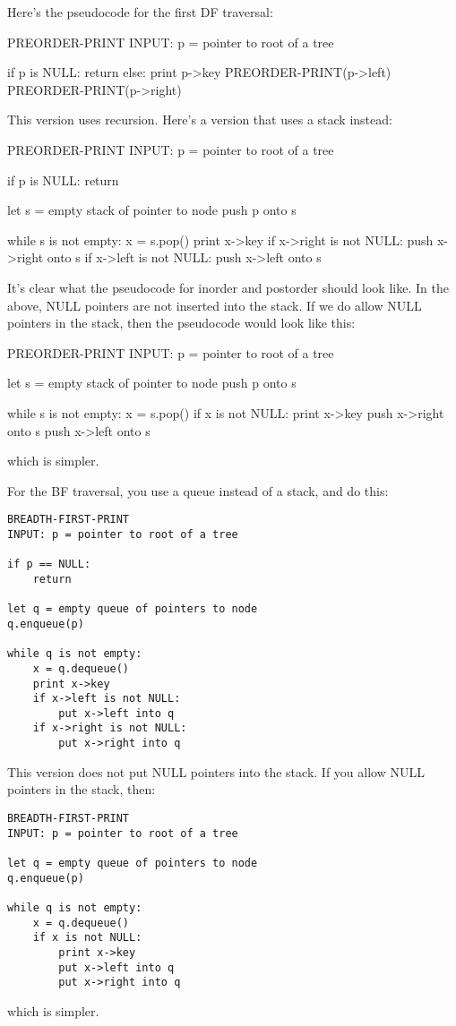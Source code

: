 Here's the pseudocode for the first DF traversal:
\begin{console}
PREORDER-PRINT
INPUT: p = pointer to root of a tree

if p is NULL: 
    return
else:
    print p->key
    PREORDER-PRINT(p->left)
    PREORDER-PRINT(p->right)
\end{console}
This version uses recursion.
Here's a version that uses a stack instead:
\begin{console}
PREORDER-PRINT
INPUT: p = pointer to root of a tree

if p is NULL:
    return

let s = empty stack of pointer to node
push p onto s

while s is not empty:
    x = s.pop()
    print x->key
    if x->right is not NULL:
        push x->right onto s
    if x->left is not NULL:
        push x->left onto s
\end{console}
It's clear what the pseudocode for inorder and postorder 
should look like.
In the above, NULL pointers are not inserted into the stack.
If we do allow NULL pointers in the stack, then the pseudocode would look
like this:
\begin{console}
PREORDER-PRINT
INPUT: p = pointer to root of a tree

let s = empty stack of pointer to node
push p onto s

while s is not empty:
    x = s.pop()
    if x is not NULL:
        print x->key
        push x->right onto s
        push x->left onto s
\end{console}
which is simpler.



For the BF traversal, you use a queue instead of a stack,
and do this:
\begin{Verbatim}[frame=single,commandchars=\\\{\}]
BREADTH-FIRST-PRINT
INPUT: p = pointer to root of a tree

if p == NULL:
    return 

let q = empty queue of pointers to node
q.enqueue(p)

while q is not empty:
    x = q.dequeue()
    print x->key
    if x->left is not NULL:
        put x->left into q
    if x->right is not NULL:
        put x->right into q  
\end{Verbatim}
This version does not put NULL pointers into the stack.
If you allow NULL pointers in the stack, then:
\begin{Verbatim}[frame=single,commandchars=\\\{\}]
BREADTH-FIRST-PRINT
INPUT: p = pointer to root of a tree

let q = empty queue of pointers to node
q.enqueue(p)

while q is not empty:
    x = q.dequeue()
    if x is not NULL:
        print x->key
        put x->left into q
        put x->right into q  
\end{Verbatim}
which is simpler.
